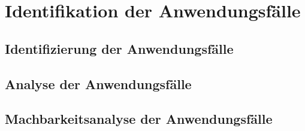 \chapter{Identifikation der Anwendungsfälle}

\section{Identifizierung der Anwendungsfälle}

\section{Analyse der Anwendungsfälle}

\section{Machbarkeitsanalyse der Anwendungsfälle}